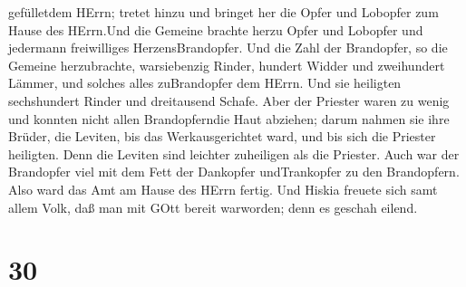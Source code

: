 gefülletdem HErrn; tretet hinzu und bringet her die Opfer und Lobopfer
zum Hause des HErrn.Und die Gemeine brachte herzu Opfer und Lobopfer und
jedermann freiwilliges HerzensBrandopfer.  Und die Zahl der
Brandopfer, so die Gemeine herzubrachte, warsiebenzig Rinder, hundert
Widder und zweihundert Lämmer, und solches alles zuBrandopfer dem HErrn.
 Und sie heiligten sechshundert Rinder und dreitausend
Schafe.  Aber der Priester waren zu wenig und konnten nicht
allen Brandopferndie Haut abziehen; darum nahmen sie ihre Brüder, die
Leviten, bis das Werkausgerichtet ward, und bis sich die Priester
heiligten. Denn die Leviten sind leichter zuheiligen als die Priester.
 Auch war der Brandopfer viel mit dem Fett der Dankopfer
undTrankopfer zu den Brandopfern. Also ward das Amt am Hause des HErrn
fertig.  Und Hiskia freuete sich samt allem Volk, daß man
mit GOtt bereit warworden; denn es geschah eilend.

\hypertarget{section-29}{%
\section{30}\label{section-29}}

